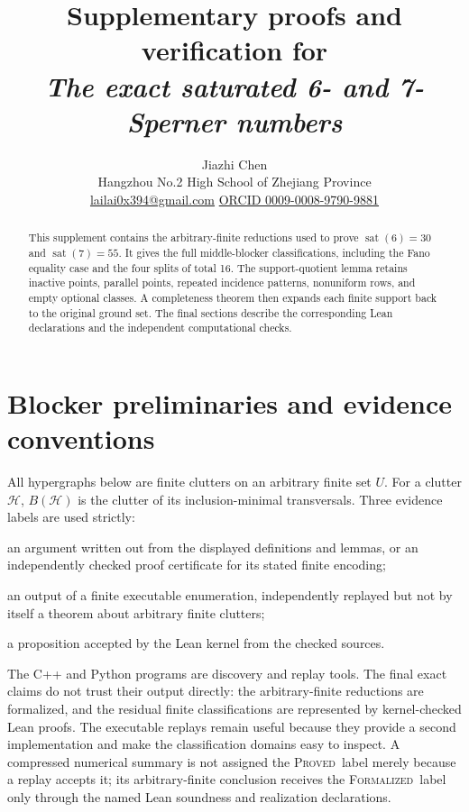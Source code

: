 \documentclass[11pt,a4paper]{article}
\title{Supplementary proofs and verification for\\
\emph{The exact saturated 6- and 7-Sperner numbers}}
\author{Jiazhi Chen\\
\small Hangzhou No.2 High School of Zhejiang Province\\
\small \href{mailto:lailai0x394@gmail.com}{lailai0x394@gmail.com}\quad
\href{https://orcid.org/0009-0008-9790-9881}{ORCID 0009-0008-9790-9881}}
\date{}
\theoremstyle{definition}
\newcommand{\blocker}{B}
\newcommand{\sat}{\operatorname{sat}}
\newcommand{\proved}{\textsc{Proved}}
\newcommand{\computed}{\textsc{Computed}}
\newcommand{\formalized}{\textsc{Formalized}}
\begin{document}
\maketitle

\begin{abstract}
This supplement contains the arbitrary-finite reductions used to prove
$\sat(6)=30$ and $\sat(7)=55$.  It gives the full middle-blocker
classifications, including the Fano equality case and the four splits of total
16.  The support-quotient lemma retains inactive points, parallel points,
repeated incidence patterns, nonuniform rows, and empty optional classes.  A
completeness theorem then expands each finite support back to the original
ground set.  The final sections describe the corresponding Lean declarations
and the independent computational checks.
\end{abstract}

\tableofcontents

\section{Blocker preliminaries and evidence conventions}
\label{sec:evidence}

All hypergraphs below are finite clutters on an arbitrary finite set $U$.
For a clutter $\mathcal H$, $\blocker(\mathcal H)$ is the clutter of its
inclusion-minimal transversals.  Three evidence labels are used strictly:

\begin{description}[style=nextline,leftmargin=29mm,font=\normalfont]
\item[\proved]
an argument written out from the displayed definitions and lemmas, or an
independently checked proof certificate for its stated finite encoding;
\item[\computed]
an output of a finite executable enumeration, independently replayed but not
by itself a theorem about arbitrary finite clutters;
\item[\formalized]
a proposition accepted by the Lean kernel from the checked sources.
\end{description}

The C++ and Python programs are discovery and replay tools.  The final exact
claims do not trust their output directly: the arbitrary-finite reductions
are formalized, and the residual finite classifications are represented by
kernel-checked Lean proofs.  The executable replays remain useful because
they provide a second implementation and make the classification domains
easy to inspect.  A compressed numerical summary is not assigned the
\proved\ label merely because a replay accepts it; its arbitrary-finite
conclusion receives the \formalized\ label only through the named Lean
soundness and realization declarations.
\end{document}
